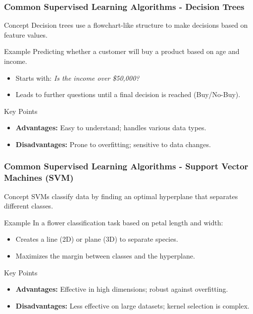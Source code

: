 \documentclass[aspectratio=169]{beamer}
\begin{document}
\begin{frame}[fragile]
    \frametitle{Common Supervised Learning Algorithms - Decision Trees}
    \begin{block}{Concept}
        Decision trees use a flowchart-like structure to make decisions based on feature values. 
    \end{block}

    \begin{block}{Example}
        Predicting whether a customer will buy a product based on age and income. 
        \begin{itemize}
            \item Starts with: \textit{Is the income over \$50,000?}
            \item Leads to further questions until a final decision is reached (Buy/No-Buy).
        \end{itemize}
    \end{block}

    \begin{block}{Key Points}
        \begin{itemize}
            \item \textbf{Advantages:} Easy to understand; handles various data types.
            \item \textbf{Disadvantages:} Prone to overfitting; sensitive to data changes.
        \end{itemize}
    \end{block}
\end{frame}

\begin{frame}[fragile]
    \frametitle{Common Supervised Learning Algorithms - Support Vector Machines (SVM)}
    \begin{block}{Concept}
        SVMs classify data by finding an optimal hyperplane that separates different classes.
    \end{block}

    \begin{block}{Example}
        In a flower classification task based on petal length and width:
        \begin{itemize}
            \item Creates a line (2D) or plane (3D) to separate species.
            \item Maximizes the margin between classes and the hyperplane.
        \end{itemize}
    \end{block}

    \begin{block}{Key Points}
        \begin{itemize}
            \item \textbf{Advantages:} Effective in high dimensions; robust against overfitting.
            \item \textbf{Disadvantages:} Less effective on large datasets; kernel selection is complex.
        \end{itemize}
    \end{block}
\end{frame}
\end{document}

